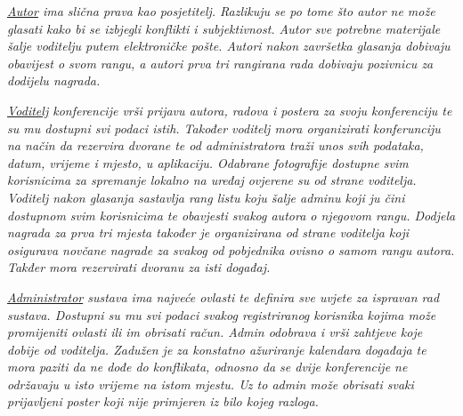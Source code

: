 		\textit{\underline{Autor} ima slična prava kao posjetitelj. Razlikuju se po tome što autor ne može glasati kako bi se izbjegli konflikti i subjektivnost. Autor sve potrebne materijale šalje voditelju putem elektroničke pošte. Autori nakon završetka glasanja dobivaju obavijest o svom rangu, a autori prva tri rangirana rada dobivaju pozivnicu za dodijelu nagrada.}

		\textit{\underline{Voditelj} konferencije vrši prijavu autora, radova i postera za svoju konferenciju te su mu dostupni svi podaci istih. Također voditelj mora organizirati konferunciju na način da rezervira dvorane te od administratora traži unos svih podataka, datum, vrijeme i mjesto, u aplikaciju. Odabrane fotografije dostupne svim korisnicima za spremanje lokalno na uređaj ovjerene su od strane voditelja. Voditelj nakon glasanja sastavlja rang listu koju šalje adminu koji ju čini dostupnom svim korisnicima te obavjesti svakog autora o njegovom rangu. Dodjela nagrada za prva tri mjesta također je organizirana od strane voditelja koji osigurava novčane nagrade za svakog od pobjednika ovisno o samom rangu autora. Takđer mora rezervirati dvoranu za isti događaj.}

		\textit{\underline{Administrator} sustava ima najveće ovlasti te definira sve uvjete za ispravan rad sustava. Dostupni su mu svi podaci svakog registriranog korisnika kojima može promijeniti ovlasti ili im obrisati račun. Admin odobrava i vrši zahtjeve koje dobije od voditelja. Zadužen je za konstatno ažuriranje kalendara događaja te mora paziti da ne dođe do konflikata, odnosno da se dvije konferencije ne održavaju u isto vrijeme na istom mjestu. Uz to admin može obrisati svaki prijavljeni poster koji nije primjeren iz bilo kojeg razloga.}

		

				

		
	